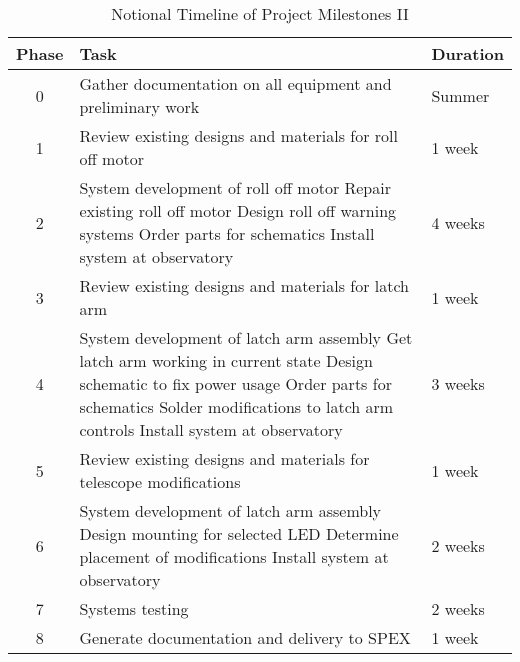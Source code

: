 \documentclass[conference]{IEEEtran} %
\begin{document}
  \begin{table}[hb!]
        \caption{Notional Timeline of Project Milestones II}
        \centering
        \begin{tabular}{@{}cll@{}}
            \toprule %
            Phase & Task & Duration \\
            \midrule %
            0 & Gather documentation on all equipment and preliminary work & Summer \\
            1 & Review existing designs and materials for roll off motor & 1 week \\
            2 & System development of roll off motor
            Repair existing roll off motor
            Design roll off warning systems
            Order parts for schematics
            Install system at observatory & 4 weeks \\
            3 & Review existing designs and materials for latch arm & 1 week \\
            4 & System development of latch arm assembly
            Get latch arm working in current state
            Design schematic to fix power usage
            Order parts for schematics
            Solder modifications to latch arm controls
            Install system at observatory & 3 weeks \\
            5 & Review existing designs and materials for telescope modifications & 1 week \\
            6 & System development of latch arm assembly
            Design mounting for selected LED
            Determine placement of modifications
            Install system at observatory & 2 weeks \\
            7 & Systems testing & 2 weeks \\
            8 & Generate documentation and delivery to SPEX & 1 week \\
            \bottomrule
        \end{tabular}
    \label{tab:timeline2}
    \end{table}
\end{document}

